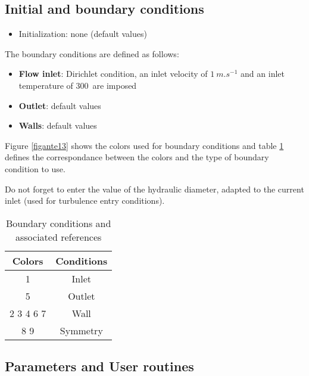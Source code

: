         \subsection{Initial and boundary conditions}

\begin{itemize}
\renewcommand{\labelitemi}{$\rightarrow$}
        \item Initialization: none (default values)
\end{itemize}


The boundary conditions are defined as follows:
\begin{itemize}
        \item {\bfseries Flow inlet}: Dirichlet condition, an inlet velocity of
$1\ m.s^{-1}$ and an inlet temperature of 300\degresC\ are imposed
        \item {\bfseries Outlet}: default values
        \item {\bfseries Walls}: default values
\end{itemize}

Figure \ref{figante13} shows the colors used for boundary conditions and
table \ref{tabante11} defines the correspondance between the colors and
the type of boundary condition to use.

Do not forget to enter the value of the hydraulic diameter, adapted to the
current inlet (used for turbulence entry conditions).\\

\begin{table}[htp]
\begin{center}
\begin{tabular}{|c|c|}
\hline
Colors & Conditions \\
\hline
1 & Inlet \\
\hline
5 & Outlet \\
\hline
2 3 4 6 7 & Wall \\
\hline
8 9 & Symmetry\\
\hline
\end{tabular}
\caption{\label{tabante11}Boundary conditions and associated references}
\end{center}
\end{table}

        \subsection{Parameters and User routines}

